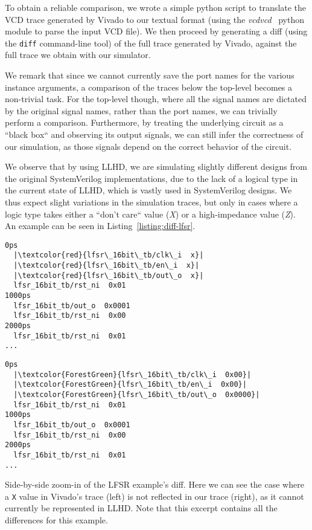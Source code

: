 To obtain a reliable comparison, we wrote a simple python script to translate the VCD trace generated by Vivado to our textual format (using the \textit{vcdvcd}~\cite{vcdvcd} python module to parse the input VCD file). We then proceed by generating a diff (using the \texttt{diff} command-line tool) of the full trace generated by Vivado, against the full trace we obtain with our simulator.

We remark that since we cannot currently save the port names for the various instance arguments, a comparison of the traces below the top-level becomes a non-trivial task. For the top-level though, where all the signal names are dictated by the original signal names, rather than the port names, we can trivially perform a comparison. Furthermore, by treating the underlying circuit as a “black box“ and observing its output signals, we can still infer the correctness of our simulation, as those signals depend on the correct behavior of the circuit.

We observe that by using LLHD, we are simulating slightly different designs from the original SystemVerilog implementations, due to the lack of a logical type in the current state of LLHD, which is vastly used in SystemVerilog designs. We thus expect slight variations in the simulation traces, but only in cases where a logic type takes either a “don't care“ value (\textit{X}) or a high-impedance value (\textit{Z}). An example can be seen in Listing~\ref{listing:diff-lfsr}.

\begin{listing}
  \lstset{
    escapeinside=||,
    basicstyle=\footnotesize\ttfamily,
    stepnumber=1
  }
  \begin{minipage}{0.45\textwidth}
    \begin{lstlisting}
0ps
  |\textcolor{red}{lfsr\_16bit\_tb/clk\_i  x}|
  |\textcolor{red}{lfsr\_16bit\_tb/en\_i  x}|
  |\textcolor{red}{lfsr\_16bit\_tb/out\_o  x}|
  lfsr_16bit_tb/rst_ni  0x01
1000ps
  lfsr_16bit_tb/out_o  0x0001
  lfsr_16bit_tb/rst_ni  0x00
2000ps
  lfsr_16bit_tb/rst_ni  0x01
...
        \end{lstlisting}
  \end{minipage}
  \hfill
  \begin{minipage}{0.45\textwidth}
    \begin{lstlisting}
0ps
  |\textcolor{ForestGreen}{lfsr\_16bit\_tb/clk\_i  0x00}|
  |\textcolor{ForestGreen}{lfsr\_16bit\_tb/en\_i  0x00}|
  |\textcolor{ForestGreen}{lfsr\_16bit\_tb/out\_o  0x0000}|
  lfsr_16bit_tb/rst_ni  0x01
1000ps
  lfsr_16bit_tb/out_o  0x0001
  lfsr_16bit_tb/rst_ni  0x00
2000ps
  lfsr_16bit_tb/rst_ni  0x01
...
        \end{lstlisting}
  \end{minipage}
  \caption[Side-by-side zoom-in of the LFSR example's diff.]{Side-by-side zoom-in of the LFSR example's diff. Here we can see the case where a \texttt{X} value in Vivado's trace (left) is not reflected in our trace (right), as it cannot currently be represented in LLHD. Note that this excerpt contains all the differences for this example.}
  \label{listing:diff-lfsr}
\end{listing}

